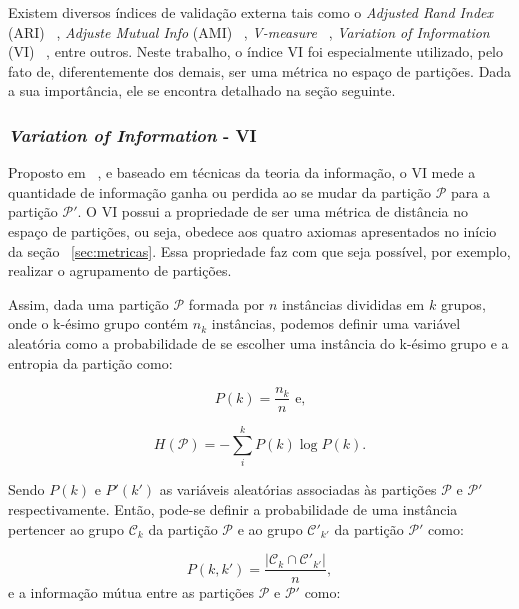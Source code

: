 Existem diversos índices de validação externa tais como o \emph{Adjusted Rand Index} (ARI) ~\parencite{Hubert1985}, \emph{Adjuste Mutual Info } (AMI) ~\parencite{AMI}, \emph{V-measure} ~\parencite{V_measure}, \emph{Variation of Information} (VI) ~\parencite{Meila}, entre outros. Neste trabalho, o índice VI foi especialmente utilizado, pelo fato de, diferentemente dos demais, ser uma métrica no espaço de partições. Dada a sua importância, ele se encontra detalhado na seção seguinte.


\subsubsection{\emph{Variation of Information} - VI} \label{sec:VI}

Proposto em ~\parencite{Meila}, e baseado em técnicas da teoria da informação, o VI mede a quantidade de informação ganha ou perdida ao se mudar da partição $\mathcal{P}$ para a partição $\mathcal{P'}$. O VI possui a propriedade de ser uma métrica de distância no espaço de partições, ou seja, obedece aos quatro axiomas apresentados no início da seção ~\ref{sec:metricas}. Essa propriedade faz com que seja possível, por exemplo, realizar o agrupamento de partições. 

Assim, dada uma partição $\mathcal{P}$ formada por $n$ instâncias divididas em $k$ grupos, onde o k-ésimo grupo contém $n_k$ instâncias, podemos definir uma variável aleatória como a probabilidade de se escolher uma instância do k-ésimo grupo e a entropia da partição como:

\begin{equation}
P(k) = \frac{n_k}{n}\text{ e,}
\end{equation}

\begin{equation}
H(\mathcal{P}) = -\sum_{i}^{k}P(k) \log P(k).
\end{equation}

Sendo $P(k)$ e $P'(k')$ as variáveis aleatórias associadas às partições $\mathcal{P}$ e $\mathcal{P'}$ respectivamente. Então, pode-se definir a probabilidade de uma instância pertencer ao grupo $\mathcal{C}_k$ da partição $\mathcal{P}$ e ao grupo $\mathcal{C'}_{k'}$ da partição $\mathcal{P'}$ como:

\begin{equation}
P(k,k') = \frac{|\mathcal{C}_k\cap \mathcal{C'}_{k'}|}{n},
\end{equation}
e a informação mútua entre as partições $\mathcal{P}$ e $\mathcal{P'}$ como:

